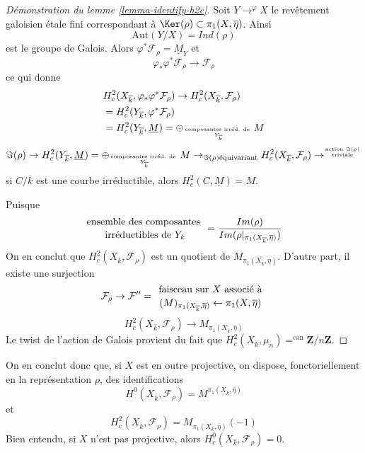 \begin{proof}[Démonstration du lemme \ref{lemma-identify-h2c}]
Soit $Y\to^{\varphi}X$ le revêtement galoisien étale fini
correspondant à $\Ker(\rho) \subset \pi_1(X, \overline\eta)$. Ainsi
$$
\text{Aut}(Y/X)=Ind(\rho)
$$
est le groupe de Galois. Alors $\varphi^*\mathcal{F}_\rho =\underline M_Y$ et
$$
\varphi_*\varphi^*\mathcal{F}_\rho\to \mathcal{F}_\rho
$$
ce qui donne
\begin{align*}
& H_c^2(X_{\overline{k}}, \varphi_*\varphi^*\mathcal{F}_\rho) \to
H_c^2(X_{\overline{k}}, \mathcal{F}_\rho)\\
& =H_c^2(Y_{\overline{k}}, \varphi^*\mathcal{F}_\rho)\\
& =H_c^2(Y_{\overline{k}}, \underline M) = \oplus_{\text{composantes irréd.
de } \atop Y_{\overline{k}}}M
\end{align*}
$$
\Im(\rho) \to H_c^2(Y_{\overline{k}}, \underline M) =
\oplus_{\text{composantes irréd. de } \atop Y_{\overline{k}}}
M \to_{\Im(\rho) \text{équivariant}} H_c^2(X_{\overline{k}},
\mathcal{F}_{\rho}) \to^{\text{action }
\Im(\rho) \atop \text{triviale}}
$$
si $C/\overline{k}$ est une courbe irréductible, alors $H_c^2(C, \underline M)=M$.

\medskip\noindent
Puisque
$$
{\text{ensemble des composantes } \atop \text{irréductibles de }Y_k} =
\frac{Im(\rho)}{Im(\rho|_{\pi_1(X_{\overline{k}}, \overline \eta)})}
$$
On en conclut que $H_c^2(X_{\overline{k}}, \mathcal{F}_\rho)$ est un
quotient de $M_{\pi_1(X_{\overline{k}}, \overline \eta)}$. D'autre part,
il existe une surjection
$$
\mathcal{F}_\rho\to \mathcal{F}'' = {\text{ faisceau sur }
X\text{ associé à } \atop (M)_{\pi_1(X_{\overline{k}}, \overline
\eta)}\leftarrow\pi_1(X, \overline \eta)}
$$
$$
H_c^2(X_{\overline{k}}, \mathcal{F}_\rho)\to
M_{\pi_1(X_{\overline{k}}, \overline\eta)}
$$
Le twist de l'action de Galois provient du fait que
$H_c^2(X_{\overline{k}}, \mu_n)=^{\text{can}} \mathbf{Z}/n\mathbf{Z}$.
\end{proof}

\begin{remark}
\label{remark-projective}
On en conclut donc que, si $X$ est en outre projective,
on dispose, fonctoriellement en la représentation $\rho$,
des identifications
$$
H^0(X_{\overline{k}}, \mathcal{F}_\rho) =
M^{\pi_1(X_{\overline{k}}, \overline\eta)}
$$
et
$$
H_c^2(X_{\overline{k}}, \mathcal{F}_\rho) =
M_{\pi_1(X_{\overline{k}}, \overline \eta)}(-1)
$$
Bien entendu, si $X$ n'est pas projective, alors
$H^0_c(X_{\overline{k}}, \mathcal{F}_\rho) = 0$.
\end{remark}


